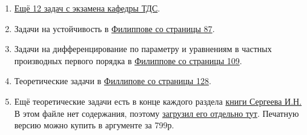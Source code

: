 \documentclass{article}
\begin{document}
\begin{enumerate}
    \item \href{https://drive.google.com/file/d/1C0imojIb-j87TLhRoWTZHxLw2uVSfrXs/view?usp=sharing}{Ещё 12 задач с экзамена кафедры ТДС}. \\

    \item Задачи на устойчивость в \href{https://drive.google.com/file/d/1vhpR3QoXntqlk_SoChT8c3pDvJQR_b-S/view?usp=drive_link}{Филиппове со страницы 87}. \\

    \item Задачи на дифференцирование по параметру и уравнениям в частных производных первого порядка в \href{https://drive.google.com/file/d/1vhpR3QoXntqlk_SoChT8c3pDvJQR_b-S/view?usp=drive_link}{Филиппове со страницы 109}. \\

    \item Теоретические задачи в \href{https://drive.google.com/file/d/1vhpR3QoXntqlk_SoChT8c3pDvJQR_b-S/view?usp=drive_link}{Филлипове со страницы 128}. \\ 

    \item Ещё теоретические задачи есть в конце каждого раздела \href{https://drive.google.com/file/d/1pRe2EkuqQ4wAvE6CoZ2OiQcv9ChMByza/view?usp=drive_link}{книги Сергеева И.Н.} В этом файле нет содержания, поэтому \href{https://drive.google.com/file/d/1MEFhGgvkHGQpBDJ4iKgh-basEIwyDFPl/view?usp=drive_link}{загрузил его отдельно тут}. Печатную версию можно купить в аргументе за 799р.
\end{enumerate}
\end{document}
